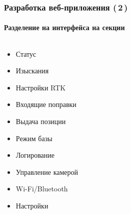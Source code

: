 \documentclass[xetex,с,aspectratio=169]{beamer}
\begin{document}

%
%
\begin{frame}
  \frametitle{Разработка веб-приложения (\,2\,)}
  \framesubtitle{Разделение на интерфейса на секции}

  \begin{columns}[T]
    \begin{column}[T]{.32\textwidth}
      \begin{itemize}
        \item<1> Статус
        \item<2> Изыскания
        \item<3> Настройки RTK
        \item<4> Входящие поправки
        \item<5> Выдача позиции
        \item<6> Режим базы
        \item<7> Логирование
        \item<8> Управление камерой
        \item<9> Wi-Fi/Bluetooth
        \item<10> Настройки
      \end{itemize}
    \end{column}
    \hspace{1em}
    \begin{column}{.64\textwidth}
\end{column}
\end{columns}
\end{frame}
\end{document}
